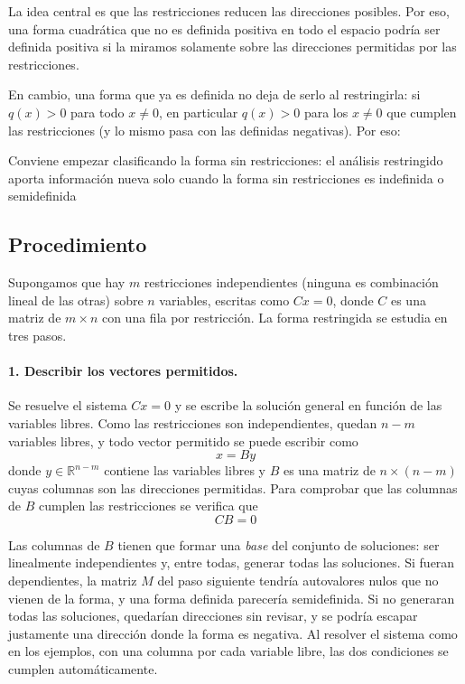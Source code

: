 \documentclass{article}
\begin{document}
La idea central es que las restricciones reducen las direcciones posibles. Por eso, una forma cuadrática que no es definida positiva en todo el espacio podría ser definida positiva si la miramos solamente sobre las direcciones permitidas por las restricciones.

En cambio, una forma que ya es definida no deja de serlo al restringirla: si \(q(x)>0\) para todo \(x\neq0\), en particular \(q(x)>0\) para los \(x\neq0\) que cumplen las restricciones (y lo mismo pasa con las definidas negativas). Por eso:

{\color{teal}
Conviene empezar clasificando la forma sin restricciones: el análisis restringido aporta información nueva solo cuando la forma sin restricciones es indefinida o semidefinida}


\subsection*{Procedimiento}

Supongamos que hay \(m\) restricciones independientes (ninguna es combinación lineal de las otras) sobre \(n\) variables, escritas como \(Cx=0\), donde \(C\) es una matriz de \(m\times n\) con una fila por restricción. La forma restringida se estudia en tres pasos.

\paragraph*{1. Describir los vectores permitidos.}
Se resuelve el sistema \(Cx=0\) y se escribe la solución general en función de las variables libres. Como las restricciones son independientes, quedan \(n-m\) variables libres, y todo vector permitido se puede escribir como
\[
x = By
\]
donde \(y\in\mathbb{R}^{n-m}\) contiene las variables libres y \(B\) es una matriz de \(n\times(n-m)\) cuyas columnas son las direcciones permitidas. Para comprobar que las columnas de \(B\) cumplen las restricciones se verifica que
\[
CB = 0
\]

Las columnas de \(B\) tienen que formar una \emph{base} del conjunto de soluciones: ser linealmente independientes y, entre todas, generar todas las soluciones. Si fueran dependientes, la matriz \(M\) del paso siguiente tendría autovalores nulos que no vienen de la forma, y una forma definida parecería semidefinida. Si no generaran todas las soluciones, quedarían direcciones sin revisar, y se podría escapar justamente una dirección donde la forma es negativa. Al resolver el sistema como en los ejemplos, con una columna por cada variable libre, las dos condiciones se cumplen automáticamente.
\end{document}
